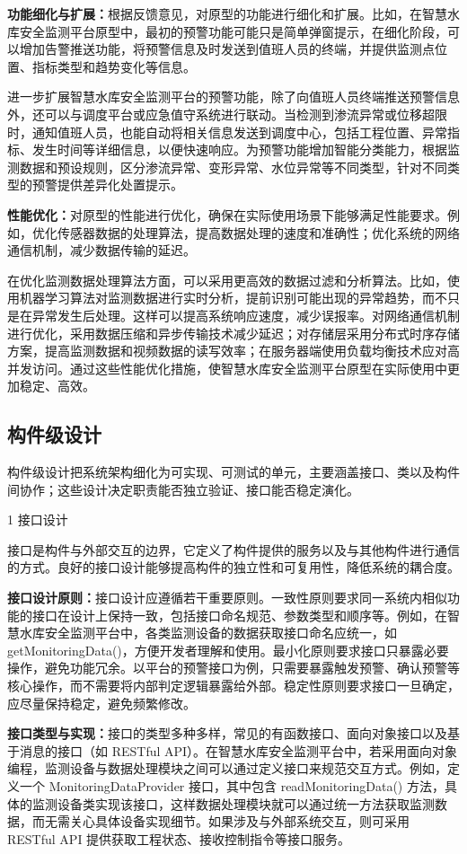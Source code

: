 \textbf{功能细化与扩展：}根据反馈意见，对原型的功能进行细化和扩展。比如，在智慧水库安全监测平台原型中，最初的预警功能可能只是简单弹窗提示，在细化阶段，可以增加告警推送功能，将预警信息及时发送到值班人员的终端，并提供监测点位置、指标类型和趋势变化等信息。

进一步扩展智慧水库安全监测平台的预警功能，除了向值班人员终端推送预警信息外，还可以与调度平台或应急值守系统进行联动。当检测到渗流异常或位移超限时，通知值班人员，也能自动将相关信息发送到调度中心，包括工程位置、异常指标、发生时间等详细信息，以便快速响应。为预警功能增加智能分类能力，根据监测数据和预设规则，区分渗流异常、变形异常、水位异常等不同类型，针对不同类型的预警提供差异化处置提示。

\textbf{性能优化：}对原型的性能进行优化，确保在实际使用场景下能够满足性能要求。例如，优化传感器数据的处理算法，提高数据处理的速度和准确性；优化系统的网络通信机制，减少数据传输的延迟。

在优化监测数据处理算法方面，可以采用更高效的数据过滤和分析算法。比如，使用机器学习算法对监测数据进行实时分析，提前识别可能出现的异常趋势，而不只是在异常发生后处理。这样可以提高系统响应速度，减少误报率。对网络通信机制进行优化，采用数据压缩和异步传输技术减少延迟；对存储层采用分布式时序存储方案，提高监测数据和视频数据的读写效率；在服务器端使用负载均衡技术应对高并发访问。通过这些性能优化措施，使智慧水库安全监测平台原型在实际使用中更加稳定、高效。

\subsection{构件级设计}

构件级设计把系统架构细化为可实现、可测试的单元，主要涵盖接口、类以及构件间协作；这些设计决定职责能否独立验证、接口能否稳定演化。

1 接口设计

接口是构件与外部交互的边界，它定义了构件提供的服务以及与其他构件进行通信的方式。良好的接口设计能够提高构件的独立性和可复用性，降低系统的耦合度。

\textbf{接口设计原则：}接口设计应遵循若干重要原则。一致性原则要求同一系统内相似功能的接口在设计上保持一致，包括接口命名规范、参数类型和顺序等。例如，在智慧水库安全监测平台中，各类监测设备的数据获取接口命名应统一，如 getMonitoringData()，方便开发者理解和使用。最小化原则要求接口只暴露必要操作，避免功能冗余。以平台的预警接口为例，只需要暴露触发预警、确认预警等核心操作，而不需要将内部判定逻辑暴露给外部。稳定性原则要求接口一旦确定，应尽量保持稳定，避免频繁修改。

\textbf{接口类型与实现：}接口的类型多种多样，常见的有函数接口、面向对象接口以及基于消息的接口（如 RESTful API）。在智慧水库安全监测平台中，若采用面向对象编程，监测设备与数据处理模块之间可以通过定义接口来规范交互方式。例如，定义一个 MonitoringDataProvider 接口，其中包含 readMonitoringData() 方法，具体的监测设备类实现该接口，这样数据处理模块就可以通过统一方法获取监测数据，而无需关心具体设备实现细节。如果涉及与外部系统交互，则可采用 RESTful API 提供获取工程状态、接收控制指令等接口服务。

